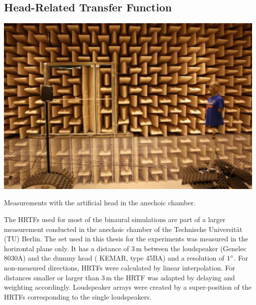 \subsection{Head-Related Transfer Function}
\label{sec:head-related-transfer-function}

\begin{marginfigure}
    \includegraphics[width=.98\columnwidth]{fig4_02/fig4_02}
    \label{fig:kemar}
    \caption{Measurements with the artificial head in the anechoic chamber.
    }
\end{marginfigure}

The \acp{HRTF} used for most of the binaural simulations
are part of a larger measurement conducted in the anechoic chamber of the
Technische Universität ({\small TU}) Berlin.\autocite[The \ac{HRTF} set is
\href{https://dev.qu.tu-berlin.de/projects/measurements/wiki/2010-11-kemar-anechoic}
{\color{link}{freely available}},
and is described in][]{Wierstorf2011a}\autocite[The author would like to
recommend the \href{https://sourceforge.net/projects/sofacoustics/}{} format for the reader that is interested in \acp{HRTF}. It is a
joined effort between different labs to define a common file format for exchanging
\acp{HRTF} and other spatial oriented acoustical measurements. It is 
described in][]{Majdak2013}
The set used in this thesis for the experiments was measured in the horizontal
plane only. It has a distance of
$3$\,m between the loudspeaker (Genelec 8030A) and the dummy head ({\small
KEMAR}, type
45BA) and a resolution of $1^\circ$.
For non-measured directions, \acp{HRTF} were calculated by linear interpolation.
For distances smaller or
larger than $3$\,m the \ac{HRTF} was adapted by delaying and weighting accordingly.
Loudspeaker arrays were created by a super-position of the \acp{HRTF}
corresponding to the single loudspeakers.


